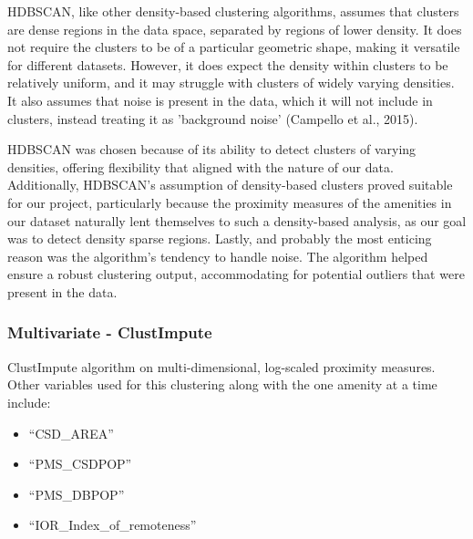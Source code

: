 \documentclass[11pt, a4paper]{article}
\begin{document}
HDBSCAN, like other density-based clustering algorithms, assumes that clusters are dense regions in the data space, separated by regions of lower density. It does not require the clusters to be of a particular geometric shape, making it versatile for different datasets. However, it does expect the density within clusters to be relatively uniform, and it may struggle with clusters of widely varying densities. It also assumes that noise is present in the data, which it will not include in clusters, instead treating it as 'background noise' (Campello et al., 2015).
\par
HDBSCAN was chosen because of its ability to detect clusters of varying densities, offering flexibility that aligned with the nature of our data. Additionally, HDBSCAN's assumption of density-based clusters proved suitable for our project, particularly because the proximity measures of the amenities in our dataset naturally lent themselves to such a density-based analysis, as our goal was to detect density sparse regions. Lastly, and probably the most enticing reason was the algorithm's tendency to handle noise. The algorithm helped ensure a robust clustering output, accommodating for potential outliers that were present in the data.








\subsubsection{Multivariate - ClustImpute}

ClustImpute algorithm on multi-dimensional, log-scaled proximity measures. Other variables used for this clustering along with the one amenity at a time include:
\begin{itemize}
\item ``CSD\_AREA''
\item ``PMS\_CSDPOP''
\item ``PMS\_DBPOP''
\item ``IOR\_Index\_of\_remoteness''
\end{itemize}
\end{document}
